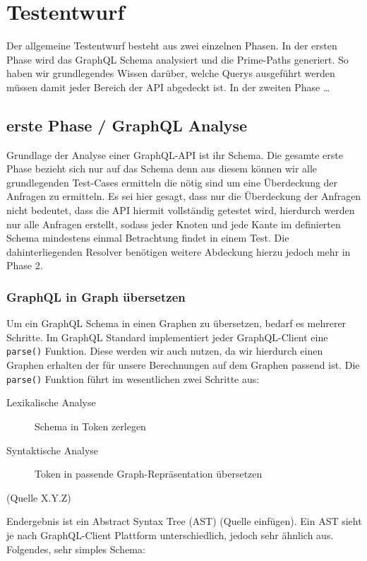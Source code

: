 \chapter{Testentwurf}

Der allgemeine Testentwurf besteht aus zwei einzelnen Phasen.
In der ersten Phase wird das GraphQL Schema analysiert und die Prime-Paths generiert.
So haben wir grundlegendes Wissen darüber, welche Querys ausgeführt werden müssen damit jeder Bereich
der API abgedeckt ist.
In der zweiten Phase \ldots

\section{erste Phase / GraphQL Analyse}

Grundlage der Analyse einer GraphQL-API ist ihr Schema.
Die gesamte erste Phase bezieht sich nur auf das Schema denn aus diesem können wir alle grundlegenden
Test-Cases ermitteln die nötig sind um eine Überdeckung der Anfragen zu ermitteln.
Es sei hier gesagt, dass nur die Überdeckung der Anfragen nicht bedeutet, dass die API hiermit vollständig getestet wird,
hierdurch werden nur alle Anfragen erstellt, sodass jeder Knoten und jede Kante im definierten Schema mindestens
einmal Betrachtung findet in einem Test.
Die dahinterliegenden Resolver benötigen weitere Abdeckung hierzu jedoch mehr in Phase 2.

\subsection{GraphQL in Graph übersetzen}

Um ein GraphQL Schema in einen Graphen zu übersetzen, bedarf es mehrerer Schritte.
Im GraphQL Standard implementiert jeder GraphQL-Client eine {\tt parse()} Funktion.
Diese werden wir auch nutzen, da wir hierdurch einen Graphen erhalten der für unsere Berechnungen auf dem
Graphen passend ist.
Die {\tt parse()} Funktion führt im wesentlichen zwei Schritte aus:

\begin{description}
    \item[Lexikalische Analyse] Schema in Token zerlegen
    \item[Syntaktische Analyse] Token in passende Graph-Repräsentation übersetzen
\end{description} (Quelle X.Y.Z)

Endergebnis ist ein Abstract Syntax Tree (AST) (Quelle einfügen).
Ein AST sieht je nach GraphQL-Client Plattform unterschiedlich, jedoch sehr ähnlich aus.
Folgendes, sehr simples Schema:


